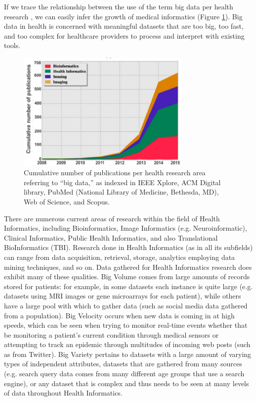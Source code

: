 If we trace the relationship between the use of the term big data per health research , we can easily infer the growth of medical informatics (Figure \ref{fig:bigDataHealthResearch}). Big data in health is concerned with meaningful datasets that are too big, too fast, and too complex for healthcare providers to process and interpret with existing tools\cite{andreu2015big}.
\begin{figure}[h!]
    \center
    \includegraphics[width=0.75\textwidth]{images/chapter1/health_publication_bigData.PNG}
    \caption{Cumulative number of publications per health research
    area referring to “big data,” as indexed in IEEE Xplore, ACM Digital library, PubMed (National Library of Medicine, Bethesda, MD), Web of Science, and Scopus.}
    \label{fig:bigDataHealthResearch}
  \end{figure}

  \newpage
There are numerous current areas of research within the field of Health Informatics, including Bioinformatics, Image Informatics (e.g. Neuroinformatic), Clinical Informatics, Public Health Informatics, and also Translational BioInformatics (TBI). Research done in Health Informatics (as in all its subfields) can range from data acquisition, retrieval, storage, analytics employing data mining techniques, and so on.
\bigbreak
Data gathered for Health Informatics research does exhibit many of these qualities. Big Volume comes from large amounts of records stored for patients: for example, in some datasets each instance is quite large (e.g. datasets using MRI images or gene microarrays for each patient), while others have a large pool with which to gather data (such as social media data gathered from a population). Big Velocity occurs when new data is coming in at high speeds, which can be seen when trying to monitor real-time events whether that be monitoring a patient’s current condition through medical sensors or attempting to track an epidemic through multitudes of incoming web posts (such as from Twitter). Big Variety pertains to datasets with a large amount of varying types of independent attributes, datasets that are gathered from many sources (e.g. search query data comes from many different age groups that use a search engine), or any dataset that is complex and thus needs to be seen at many levels of data throughout Health Informatics.

